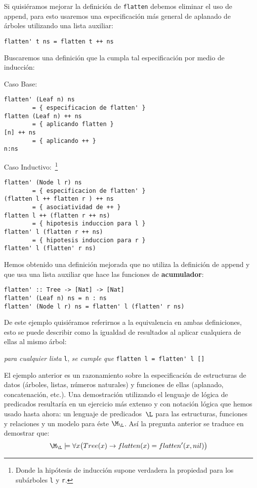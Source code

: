 \documentclass[11pt,letterpaper]{article}
\begin{document}
\bigskip

Si quisi\'eramos mejorar la definici\'on de \verb=flatten= debemos eliminar el 
uso de append, para esto usaremos una especificaci\'on m\'as general de 
aplanado de \'arboles utilizando una lista auxiliar:
\begin{center} \verb!flatten' t ns = flatten t ++ ns! \end{center}
Buscaremos una definici\'on que la cumpla tal especificaci\'on por medio de 
inducci\'on:
\bi
\item Caso Base: 
\begin{lstlisting}
flatten' (Leaf n) ns
        = { especificacion de flatten' }
flatten (Leaf n) ++ ns
        = { aplicando flatten }
[n] ++ ns
        = { aplicando ++ }
n:ns
\end{lstlisting}


\item Caso Inductivo:~\footnote{Donde la hip\'otesis de inducci\'on supone 
verdadera la propiedad para los sub\'arboles \texttt{l} y \texttt{r}.}
\begin{lstlisting}
flatten' (Node l r) ns
        = { especificacion de flatten' }
(flatten l ++ flatten r ) ++ ns
        = { asociatividad de ++ }
flatten l ++ (flatten r ++ ns)
        = { hipotesis induccion para l }
flatten' l (flatten r ++ ns)
        = { hipotesis induccion para r }
flatten' l (flatten' r ns)
\end{lstlisting}
\ei

Hemos obtenido una definici\'on mejorada que no utiliza la definici\'on de 
append y que usa una lista auxiliar que hace las funciones de 
\textbf{acumulador}:
\begin{lstlisting}
flatten' :: Tree -> [Nat] -> [Nat]
flatten' (Leaf n) ns = n : ns
flatten' (Node l r) ns = flatten' l (flatten' r ns)
\end{lstlisting}
De este ejemplo quisi\'eramos referirnos a la equivalencia en ambas 
definiciones, esto se puede describir como la igualdad de resultados al aplicar 
cualquiera de ellas al mismo árbol:
\begin{center}
\textit{para cualquier lista} \verb-l-, \textit{se cumple que} \; 
\verb-flatten l = flatten' l []-
\end{center}

\medskip

El ejemplo anterior es un razonamiento sobre la especificaci\'on de estructuras 
de datos (\'arboles, listas, n\'umeros naturales) y funciones de ellas 
(aplanado, concatenaci\'on, etc.). Una demostraci\'on utilizando el lenguaje de 
l\'ogica de predicados resultar\'ia en un ejercicio m\'as extenso y con 
notaci\'on l\'ogica que hemos usado hasta ahora: un lenguaje de predicados~$\L$ 
para las estructuras, funciones y relaciones y un modelo para \'este $\M_{\L}$.
As\'i la pregunta anterior se traduce en demostrar que:
\[
 \M_{\L} \models \forall x \big(Tree(x) \to flatten(x) = flatten'(x,nil) \big)
\]
\end{document}
